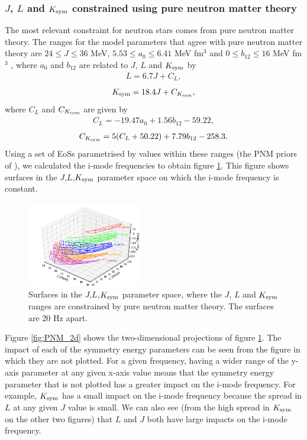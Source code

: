 \documentclass[fleqn,usenatbib]{mnras}
\begin{document}
\subsubsection{$J$, $L$ and $K_{\rm sym}$ constrained using pure neutron matter theory}
\hspace{\parindent}The most relevant constraint for neutron stars comes from pure neutron matter theory. The ranges for the model parameters that agree with pure neutron matter theory are $24\leq J\leq 36$ MeV, $5.53\leq a_0\leq 6.41$ MeV fm$^3$ and $0\leq b_{12}\leq 16$ MeV fm$^3$ \citet{holt2018universal}, where $a_0$ and $b_{12}$ are related to $J$, $L$ and $K_{\rm sym}$ by \citet{newton2020nuclear}
\begin{align}
L=6.7J+C_L,
\end{align}
\begin{align}
K_{\rm sym}=18.4J+C_{K_{\rm sym}},
\end{align}
\noindent where $C_L$ and $C_{K_{\rm sym}}$ are given by
\begin{align}
C_L=-19.47a_0+1.56b_{12}-59.22,
\end{align}
\begin{align}
C_{K_{\rm sym}}=5(C_L+50.22)+7.79b_{12}-258.3.
\end{align}
\noindent Using a set of EoSs parametrised by values within these ranges (the PNM priors of \citet{newton2020nuclear}), we calculated the i-mode frequencies to obtain figure \ref{fig:PNM_planes}. This figure shows surfaces in the $J$,$L$,$K_{\rm sym}$ parameter space on which the i-mode frequency is constant.

\begin{figure}
\centering
\includegraphics[width=0.45\textwidth,angle=0]{PNM_planes}
\caption{Surfaces in the $J$,$L$,$K_{\rm sym}$ parameter space, where the $J$, $L$ and $K_{\rm sym}$ ranges are constrained by pure neutron matter theory. The surfaces are 20 Hz apart.}
\label{fig:PNM_planes}
\end{figure}

\hspace{\parindent}Figure \ref{fig:PNM_2d} shows the two-dimensional projections of figure \ref{fig:PNM_planes}. The impact of each of the symmetry energy parameters can be seen from the figure in which they are not plotted. For a given frequency, having a wider range of the y-axis parameter at any given x-axis value means that the symmetry energy parameter that is not plotted has a greater impact on the i-mode frequency. For example, $K_{\rm sym}$ has a small impact on the i-mode frequency because the spread in $L$ at any given $J$ value is small. We can also see (from the high spread in $K_{\rm sym}$ on the other two figures) that $L$ and $J$ both have large impacts on the i-mode frequency.
\end{document}
